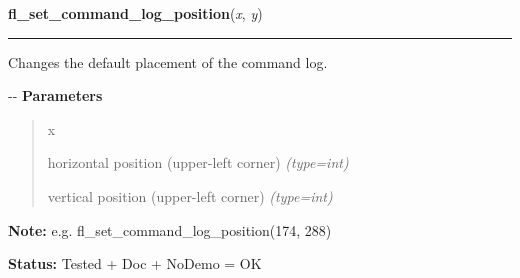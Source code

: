 \hspace{.8\funcindent}\begin{boxedminipage}{\funcwidth}

    \raggedright \textbf{fl\_set\_command\_log\_position}(\textit{x}, \textit{y})

    \vspace{-1.5ex}

    \rule{\textwidth}{0.5\fboxrule}
\setlength{\parskip}{2ex}

Changes the default placement of the command log.

-{}-
\setlength{\parskip}{1ex}
      \textbf{Parameters}
      \vspace{-1ex}

      \begin{quote}
        \begin{Ventry}{x}

          \item[x]


horizontal position (upper-left corner)
            {\it (type=int)}

          \item[y]


vertical position (upper-left corner)
            {\it (type=int)}

        \end{Ventry}

      \end{quote}

\textbf{Note:} 
e.g. fl\_set\_command\_log\_position(174, 288)


\textbf{Status:} 
Tested + Doc + NoDemo = OK


    \end{boxedminipage}

    \label{xformslib:flgoodies:fl_get_command_log_fdstruct}

    \vspace{0.5ex}

